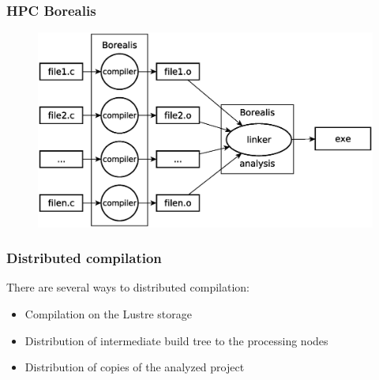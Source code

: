 

\begin{frame}
\frametitle{HPC Borealis}
	\begin{figure}
		\includegraphics[width=115mm]{image/compile}
	\end{figure}	
\end{frame}



\begin{frame}
\frametitle{Distributed compilation}
There are several ways to distributed compilation:
\begin{itemize}
	\item Compilation on the Lustre storage
	\item Distribution of intermediate build tree to the processing nodes
	\item Distribution of copies of the analyzed project
\end{itemize} 
\end{frame}


